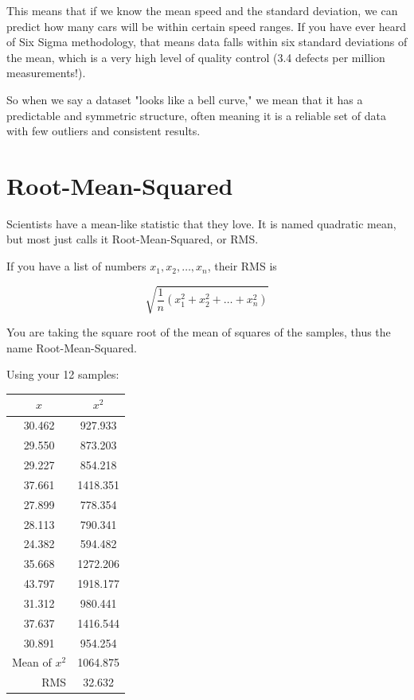 This means that if we know the mean speed and the standard deviation, we can predict how many cars will be within certain speed ranges. If you have ever heard of Six Sigma methodology, that means data falls within six standard deviations of the mean, which is a very high level of quality control (3.4 defects per million measurements!).

So when we say a dataset "looks like a bell curve," we mean that it has a predictable and symmetric structure, often meaning it is a reliable set of data with few outliers and consistent results.


\section{Root-Mean-Squared}

Scientists have a mean-like statistic that they love. It is named
quadratic mean, but most just calls it Root-Mean-Squared, or
RMS.

\begin{mdframed}[style=important, frametitle={Definition of RMS}]

If you have a list of numbers $x_1, x_2, \ldots, x_n$, their RMS
is   

$$\sqrt{\frac{1}{n}\left( x_1^2 + x_2^2 + \ldots + x_n^2 \right)}$$

\end{mdframed}

You are taking the square root of the mean of squares of the samples,
thus the name Root-Mean-Squared.

Using your 12 samples:

\begin{tabular}{c |  c}
  $x$ & $x^2$ \\
  \hline
30.462 & 927.933 \\
29.550 & 873.203\\
29.227 & 854.218\\
37.661 & 1418.351\\
27.899 & 778.354\\
28.113 & 790.341\\
24.382 & 594.482\\
35.668 & 1272.206\\
43.797 & 1918.177\\
31.312 & 980.441\\
37.637 & 1416.544\\
30.891 & 954.254\\
\hline
\multicolumn{1}{r}{Mean of $x^2$} & {1064.875}\\
\multicolumn{1}{r}{RMS} & {32.632}
  \end{tabular}

